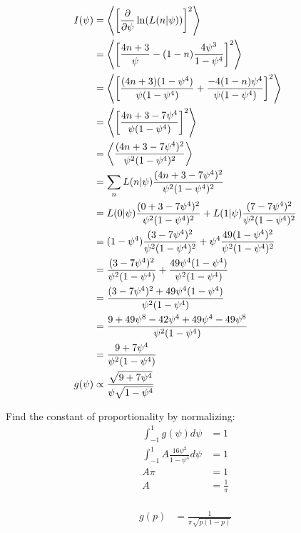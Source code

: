 \begin{enumerate}[label=\textbf{\Alph*}.]
    \begin{align*}
        I(\psi) &=  \left< \left[\frac{\partial}{\partial \psi} \ln(L(n|\psi))\right]^2 \right> \\
        &= \left< \left[\frac{4n+3}{\psi} - (1-n)\frac{4\psi^3}{1-\psi^4}\right]^2 \right> \\
        &= \left< \left[\frac{(4n+3)(1-\psi^4)}{\psi(1-\psi^4)}+\frac{-4(1-n)\psi^4}{\psi(1-\psi^4)}\right]^2 \right> \\
        &= \left< \left[\frac{4n + 3 - 7\psi^4}{\psi(1-\psi^4)}\right]^2 \right> \\
        &= \left< \frac{(4n + 3 - 7\psi^4)^2}{\psi^2(1-\psi^4)^2} \right> \\
        &= \sum_n L(n|\psi) \frac{(4n + 3 - 7\psi^4)^2}{\psi^2(1-\psi^4)^2} \\
        &= L(0|\psi) \frac{(0 + 3 - 7\psi^4)^2}{\psi^2(1-\psi^4)^2} + L(1|\psi) \frac{(7 - 7\psi^4)^2}{\psi^2(1-\psi^4)^2} \\
        &= (1 - \psi^4) \frac{(3 - 7\psi^4)^2}{\psi^2(1-\psi^4)^2} + \psi^4 \frac{49(1 - \psi^4)^2}{\psi^2(1-\psi^4)^2} \\
        &= \frac{(3 - 7\psi^4)^2}{\psi^2(1-\psi^4)} + \frac{49\psi^4 (1 - \psi^4)}{\psi^2(1-\psi^4)} \\
        &= \frac{(3 - 7\psi^4)^2 + 49\psi^4 (1 - \psi^4)}{\psi^2(1-\psi^4)} \\
        &= \frac{9 + 49\psi^8 -42\psi^4 + 49\psi^4 - 49\psi^8}{\psi^2(1-\psi^4)} \\
        &= \frac{9 +7\psi^4}{\psi^2(1-\psi^4)} \\
        g(\psi) &\propto \frac{\sqrt{9 +7\psi^4}}{\psi\sqrt{1-\psi^4}} \\
    \end{align*}

    Find the constant of proportionality by normalizing:
    \begin{align*}
        \int_{-1}^1 g(\psi)d\psi &= 1 \\
        \int_{-1}^1 A \frac{16\psi^2}{1-\psi^4} d\psi &= 1 \\
        A \pi &= 1 \\
        A &= \frac{1}{\pi} \\
    \end{align*}

    \begin{align*}
        g(p) &= \frac{1}{\pi\sqrt{p(1-p)}} \\
    \end{align*}


\end{enumerate}
